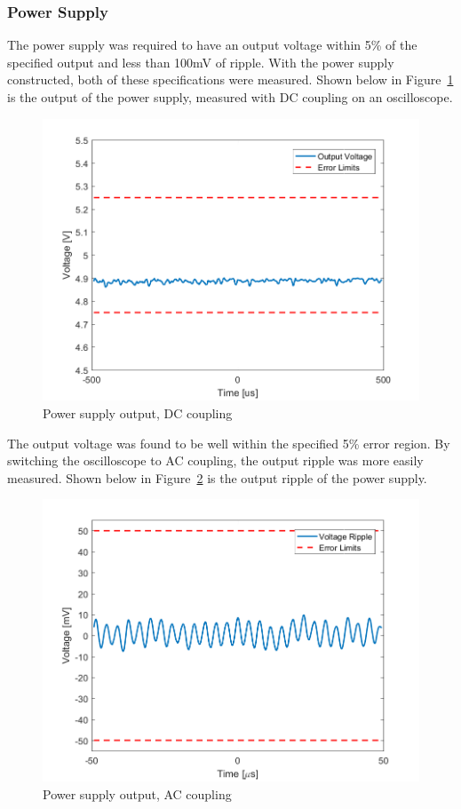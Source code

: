 \documentclass[11pt]{article}
\begin{document}
\subsubsection{Power Supply}
The power supply was required to have an output voltage within 5\% of the specified output and less than 100mV of ripple. With the power supply constructed, both of these specifications were measured. Shown below in Figure~\ref{fig:ps_dc} is the output of the power supply, measured with DC coupling on an oscilloscope.

\begin{figure}[H]
    \centering
    \includegraphics[width=\textwidth]{power_supply_dc}
    \caption{Power supply output, DC coupling}
    \label{fig:ps_dc}
\end{figure}

The output voltage was found to be well within the specified 5\% error region. By switching the oscilloscope to AC coupling, the output ripple was more easily measured. Shown below in Figure~\ref{fig:ps_ac} is the output ripple of the power supply.

\begin{figure}[H]
    \centering
    \includegraphics[width=\textwidth]{power_supply_ac}
    \caption{Power supply output, AC coupling}
    \label{fig:ps_ac}
\end{figure}
\end{document}
